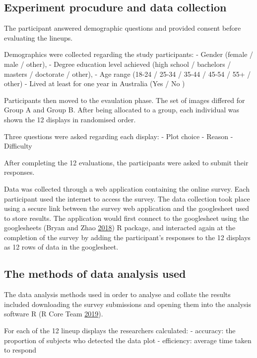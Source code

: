 \documentclass[conference,final,]{IEEEtran}
\begin{document}
\hypertarget{experiment-procudure-and-data-collection}{%
\subsection{Experiment procudure and data
collection}\label{experiment-procudure-and-data-collection}}

The participant answered demographic questions and provided consent
before evaluating the lineups.

Demographics were collected regarding the study participants: - Gender
(female / male / other), - Degree education level achieved (high school
/ bachelors / masters / doctorate / other), - Age range (18-24 / 25-34 /
35-44 / 45-54 / 55+ / other) - Lived at least for one year in Australia
(Yes / No )

Participants then moved to the evaulation phase. The set of images
differed for Group A and Group B. After being allocated to a group, each
individual was shown the 12 displays in randomised order.

Three questions were asked regarding each display: - Plot choice -
Reason - Difficulty

After completing the 12 evaluations, the participants were asked to
submit their responses.

Data was collected through a web application containing the online
survey. Each participant used the internet to access the survey. The
data collection took place using a secure link between the survey web
application and the googlesheet used to store results. The application
would first connect to the googlesheet using the googlesheets (Bryan and
Zhao \protect\hyperlink{ref-sheets}{2018}) R package, and interacted
again at the completion of the survey by adding the participant's
responses to the 12 displays as 12 rows of data in the googlesheet.

\hypertarget{the-methods-of-data-analysis-used}{%
\subsection{The methods of data analysis
used}\label{the-methods-of-data-analysis-used}}

The data analysis methods used in order to analyse and collate the
results included downloading the survey submissions and opening them
into the analysis software R (R Core Team
\protect\hyperlink{ref-RCore}{2019}).

For each of the 12 lineup displays the researchers calculated: -
accuracy: the proportion of subjects who detected the data plot -
efficiency: average time taken to respond
\end{document}
